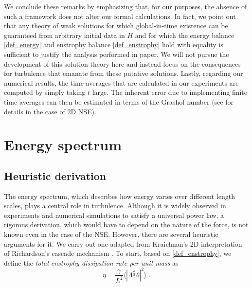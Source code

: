 \documentclass[twoside, reqno]{amsart}
\numberwithin{lemma}{section}
\numberwithin{theorem}{section}
\numberwithin{proposition}{section}
\numberwithin{equation}{section} %
\newcommand{\te}{\theta}
\newcommand{\ga}{\gamma}
\newcommand{\la}{\Lambda}
\begin{document}
{We conclude these remarks by emphasizing that, for our purposes, the absence of such a framework does not alter our formal calculations. {In fact, we point out that any theory of weak solutions for which global-in-time existence can be guaranteed from arbitrary initial data in $H$ and for which the energy balance \eqref{def_energy} and enstrophy balance \eqref{def_enstrophy} hold with equality is sufficient to justify the analysis performed in paper. We will not pursue the development of this solution theory here and instead focus on the consequences for turbulence that emanate from these putative solutions. Lastly, regarding our numerical results, the time-averages} that are calculated in our experiments are computed by simply taking $t$ large. The inherent error due 
to {implementing} finite time averages {can then be} estimated in terms of the Grashof number {(see \cite{FJM2005} for details in the case of 2D NSE)}.

}

\section{Energy spectrum}
\subsection{Heuristic derivation}
The energy spectrum, which describes how energy varies over different length scales,  plays a central role in turbulence.  Although it is widely observed in experiments and numerical simulations to satisfy a universal power law, a rigorous derivation, which would have to depend on the nature of the force, is not known even in the case of the NSE.   However, there are several heuristic arguments for it.   We carry out one adapted from Kraichnan's 2D interpretation of Richardson's cascade mechanism \cite{Kraichnan1967}.   To start, based on \eqref{def_enstrophy}, we define the \textit{total {enstrophy} dissipation rate per unit mass} as
\begin{equation} \label{def:eta}
    \eta = \frac{\ga}{L^2} \langle|\la^{\frac{\alpha}{2}} \te|^2\rangle \;.
\end{equation}
\end{document}
